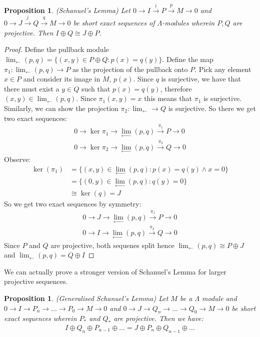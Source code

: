 \documentclass[12pt]{book}
\newtheorem{proposition}[theorem]{Proposition}
\theoremstyle{definition}
\begin{document}
\begin{proposition} (Schanuel's Lemma)
    Let $0 \rightarrow I \xrightarrow{i} P \xrightarrow{p} M \rightarrow 0$ and $0 \rightarrow J \xrightarrow{j} Q \xrightarrow{q} M \rightarrow 0$ be short exact sequences of $\Lambda$-modules wherein $P, Q$ are projective. Then $I \oplus Q \cong J \oplus P$.
\end{proposition}
\begin{proof}
    Define the pullback module $\lim_{\leftarrow}(p,q) = \{(x,y) \in P \oplus Q: p(x) = q(y)\}$. Define the map $\pi_1 : \lim_{\leftarrow}(p,q) \to P$ as the projection of the pullback onto $P$. Pick any element $x \in P$ and consider its image in $M$, $p(x)$. Since $q$ is surjective, we have that there must exist a $y \in Q$ such that $p(x) = q(y)$, therefore $(x,y) \in \lim_{\leftarrow}(p,q)$. Since $\pi_1(x,y) = x$ this means that $\pi_1$ is surjective. Similarly, we can show the projection $\pi_2: \lim_{\leftarrow} \to Q$ is surjective. So there we get two exact sequences: 
    \begin{align*}
        0 \rightarrow \ker{\pi_1} \rightarrow \lim_{\leftarrow}(p,q) \xrightarrow{\pi_1} P \rightarrow 0\\
        0 \rightarrow \ker{\pi_2} \rightarrow \lim_{\leftarrow}(p,q) \xrightarrow{\pi_2} Q \rightarrow 0
    \end{align*}
    Observe: 
    \begin{align*}
        \ker(\pi_1) &= \{(x,y) \in \lim_{\leftarrow}(p,q): p(x) = q(y) \land x = 0 \}\\
                    &= \{(0,y) \in \lim_{\leftarrow}(p,q): q(y) = 0\}\\
                    &\cong \ker(q) = J                   
    \end{align*}
    So we get two exact sequences by symmetry:
    \begin{align*}
        0 \rightarrow J \rightarrow \lim_{\leftarrow}(p,q) \xrightarrow{\pi_1} P \rightarrow 0\\
        0 \rightarrow I \rightarrow \lim_{\leftarrow}(p,q) \xrightarrow{\pi_2} Q \rightarrow 0
    \end{align*}
    Since $P$ and $Q$ are projective, both sequenes split hence $\lim_{\leftarrow}(p,q) \cong P \oplus J$ and $\lim_{\leftarrow}(p,q) = Q \oplus I$
\end{proof}
    We can actually prove a stronger version of Schanuel's Lemma for larger projective sequences. 
\begin{proposition}
    (Generalised Schanuel's Lemma)
    Let $M$ be a $\Lambda$ module and $0 \rightarrow I \rightarrow P_n \rightarrow \dots \rightarrow P_0 \rightarrow M \rightarrow 0$ and $0 \rightarrow J \rightarrow Q_n \rightarrow \dots \rightarrow Q_0 \rightarrow M \rightarrow 0$ be short exact sequences wherein $P_*$ and $Q_*$ are projective. Then we have: 
    \begin{align*}
        I \oplus Q_n \oplus P_{n-1} \oplus \dots = J \oplus P_n \oplus Q_{n-1} \oplus \dots 
    \end{align*}
\end{proposition}
\end{document}
